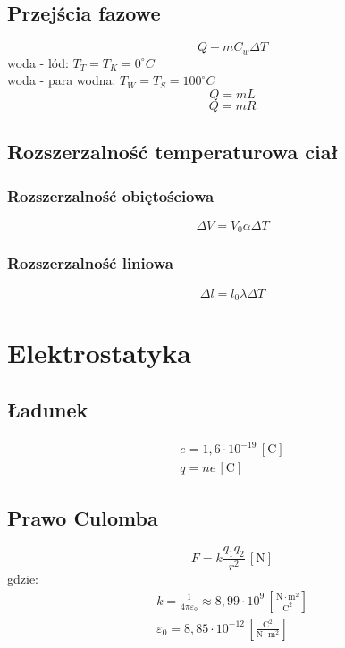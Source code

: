 \documentclass{article}
\numberwithin{equation}{section}
\newcommand{\unit}[1]{\, \left[\mathrm{#1}\right]}
\begin{document}
    \subsection{Przejścia fazowe}
      \begin{equation}
        Q - mC_w\Delta T
      \end{equation}
      woda - lód: $T_T = T_K = 0^\circ C$\\
      woda - para wodna: $T_W = T_S = 100^\circ C$
      \begin{equation}
        Q = mL
      \end{equation}
      \begin{equation}
        Q = mR
      \end{equation}
    \subsection{Rozszerzalność temperaturowa ciał}
      \subsubsection{Rozszerzalność obiętościowa}
        \begin{equation}
          \Delta V = V_0\alpha\Delta T
        \end{equation}
      \subsubsection{Rozszerzalność liniowa}
        \begin{equation}
          \Delta l = l_0\lambda\Delta T
        \end{equation}

  \newpage
  \section{Elektrostatyka}
    \subsection{Ładunek}
      \begin{gather}
        e = 1,6\cdot 10^{-19} \unit{C}\\
        q = ne \unit{C}
      \end{gather}
    \subsection{Prawo Culomba}
      \begin{equation}
        F = k\frac{q_1q_2}{r^2} \unit{N}
      \end{equation}
      gdzie:
      \begin{gather}
        k = \frac{1}{4\pi\varepsilon_0} \approx 8,99\cdot 10^9 \unit{\frac{N\cdot m^2}{C^2}}\\
        \varepsilon_0 = 8,85\cdot 10^{-12} \unit{\frac{C^2}{N\cdot m^2}}
      \end{gather}
\end{document}
